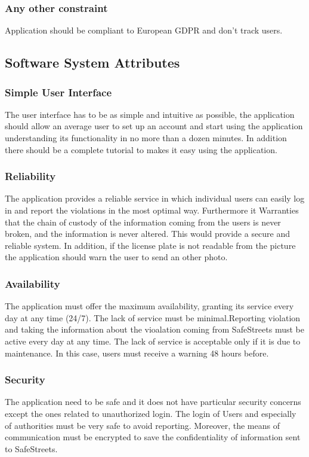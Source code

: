 \begin{enumerate}
\begin{itemize}
\subsubsection{Any other constraint}
Application should be compliant to European GDPR and don't track users.

\subsection{Software System Attributes} %
\subsubsection{Simple User Interface}
The user interface has to be as simple and intuitive as possible, the application should allow an average user to set up an account and start using the application understanding its functionality in no more than a dozen minutes. In addition there should be a complete tutorial to makes it easy using the application.

\subsubsection{Reliability}
The application provides a reliable service in which individual users can easily log in and report the violations in the most optimal way. Furthermore it Warranties that the chain of custody of the information coming from the users is never broken, and the information is never altered. This would provide a secure and reliable system. In addition, if the license plate	is not readable from the picture the application should warn the user to send an other photo.
\subsubsection{Availability}
The application must offer the maximum availability, granting its service every day at any time (24/7). The lack of service must be minimal.Reporting violation and taking the information about the vioalation coming from SafeStreets must be active every day at any time. The lack of service is acceptable only if it is due to maintenance. In this case, users must receive a warning 48 hours before.
\subsubsection{Security}
The application need to be safe and it does not have particular security concerns except the ones related to unauthorized login. The login of Users and especially of authorities must be very safe to avoid reporting. Moreover, the means of communication must be encrypted to save the confidentiality of information sent to SafeStreets.

\end{itemize}
\end{enumerate}

